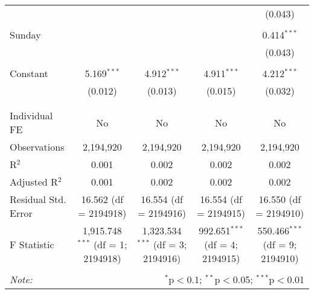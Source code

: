 \documentclass[
]{article}
\begin{document}
\begin{table}[!htbp]
{\begin{tabular}{@{\extracolsep{5pt}}lcccc}
  &  &  &  & (0.043) \\ 
  & & & & \\ 
 Sunday &  &  &  & 0.414$^{***}$ \\ 
  &  &  &  & (0.043) \\ 
  & & & & \\ 
 Constant & 5.169$^{***}$ & 4.912$^{***}$ & 4.911$^{***}$ & 4.212$^{***}$ \\ 
  & (0.012) & (0.013) & (0.015) & (0.032) \\ 
  & & & & \\ 
\hline \\[-1.8ex] 
Individual FE & No & No & No & No \\ 
Observations & 2,194,920 & 2,194,920 & 2,194,920 & 2,194,920 \\ 
R$^{2}$ & 0.001 & 0.002 & 0.002 & 0.002 \\ 
Adjusted R$^{2}$ & 0.001 & 0.002 & 0.002 & 0.002 \\ 
Residual Std. Error & 16.562 (df = 2194918) & 16.554 (df = 2194916) & 16.554 (df = 2194915) & 16.550 (df = 2194910) \\ 
F Statistic & 1,915.748$^{***}$ (df = 1; 2194918) & 1,323.534$^{***}$ (df = 3; 2194916) & 992.651$^{***}$ (df = 4; 2194915) & 550.466$^{***}$ (df = 9; 2194910) \\ 
\hline 
\hline \\[-1.8ex] 
\textit{Note:}  & \multicolumn{4}{r}{$^{*}$p$<$0.1; $^{**}$p$<$0.05; $^{***}$p$<$0.01} \\ 
\end{tabular}
} 
\end{table} 
\newpage
\end{document}

